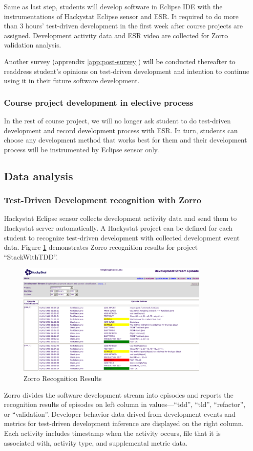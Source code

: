 Same as last step, students will develop software in Eclipse IDE with the
instrumentations of Hackystat Eclipse sensor and ESR. It required to do
more than 3 hours' test-driven development in the first week after course
projects are assigned. Development activity data and ESR video are
collected for Zorro validation analysis.

Another survey (apprendix \ref{app:post-survey}) will be conducted
thereafter to readdress student's opinions on test-driven development and
intention to continue using it in their future software development.

\subsubsection{Course project development in elective process}
In the rest of course project, we will no longer ask student to do
test-driven development and record development process with ESR. In turn,
students can choose any development method that works best for them and
their development process will be instrumented by Eclipse sensor only.

\subsection{Data analysis}
\subsubsection{Test-Driven Development recognition with Zorro}
Hackystat Eclipse sensor collects development activity data and send them
to Hackystat server automatically. A Hackystat project can be defined for
each student to recognize test-driven development with collected
development event data. Figure \ref{fig:zorro-gui} demonstrates Zorro
recognition results for project ``StackWithTDD''.
\begin{figure}[htbp]
  \centering
  \includegraphics[width=0.85\textwidth]{figs/zorro-interface.eps}
  \caption{Zorro Recognition Results}\label{fig:zorro-gui}
\end{figure} 
Zorro divides the software development stream into episodes and reports the
recognition results of episodes on left column in values---``tdd'',
``tld'', ``refactor'', or ``validation''. Developer behavior data drived
from development events and metrics for test-driven development inference
are displayed on the right column. Each activity includes timestamp when
the activity occurs, file that it is associated with, activity type, and
supplemental metric data.

